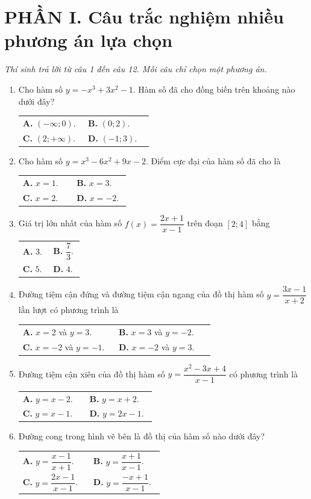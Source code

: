 \documentclass[12pt,a4paper]{article}
\makeatletter
\newcommand{\bonpa}[4]{\par\nobreak\smallskip\nobreak\noindent
\begin{tabular}{@{}p{0.47\linewidth}p{0.47\linewidth}@{}}
\textbf{A.} #1 & \textbf{B.} #2\\[8pt]
\textbf{C.} #3 & \textbf{D.} #4\end{tabular}}
\makeatother
\begin{document}
\section*{\large PHẦN I. Câu trắc nghiệm nhiều phương án lựa chọn}
\textit{Thí sinh trả lời từ câu 1 đến câu 12. Mỗi câu chỉ chọn một phương án.}
\begin{enumerate}
\item Cho hàm số $y=-x^3+3x^2-1$. Hàm số đã cho đồng biến trên khoảng nào dưới đây?
\bonpa{$(-\infty;0)$.}{$(0;2)$.}{$(2;+\infty)$.}{$(-1;3)$.}

\item Cho hàm số $y=x^3-6x^2+9x-2$. Điểm cực đại của hàm số đã cho là
\bonpa{$x=1$.}{$x=3$.}{$x=2$.}{$x=-2$.}

\item Giá trị lớn nhất của hàm số $f(x)=\dfrac{2x+1}{x-1}$ trên đoạn $[2;4]$ bằng
\bonpa{$3$.}{$\dfrac{7}{3}$.}{$5$.}{$4$.}

\item Đường tiệm cận đứng và đường tiệm cận ngang của đồ thị hàm số $y=\dfrac{3x-1}{x+2}$ lần lượt có phương trình là
\bonpa{$x=2$ và $y=3$.}{$x=3$ và $y=-2$.}{$x=-2$ và $y=-1$.}{$x=-2$ và $y=3$.}

\item Đường tiệm cận xiên của đồ thị hàm số $y=\dfrac{x^2-3x+4}{x-1}$ có phương trình là
\bonpa{$y=x-2$.}{$y=x+2$.}{$y=x-1$.}{$y=2x-1$.}

\item Đường cong trong hình vẽ bên là đồ thị của hàm số nào dưới đây?
\par\nobreak\smallskip
\begin{minipage}[c]{0.62\linewidth}
\bonpa{$y=\dfrac{x-1}{x+1}$.}{$y=\dfrac{x+1}{x-1}$.}{$y=\dfrac{2x-1}{x-1}$.}{$y=\dfrac{-x+1}{x-1}$.}
\end{minipage}\hfill
\begin{minipage}[c]{0.36\linewidth}\centering
{}
\end{minipage}
\end{enumerate}
\end{document}
